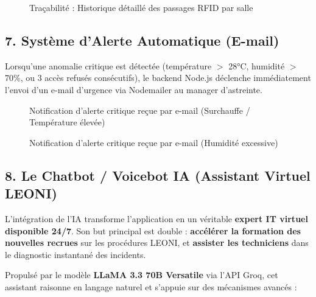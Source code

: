 \documentclass[12pt,a4paper]{report}
\begin{document}
\begin{figure}[h]
    \centering
    \caption{Traçabilité : Historique détaillé des passages RFID par salle}
\end{figure}

\subsection{7. Système d'Alerte Automatique (E-mail)}
Lorsqu'une anomalie critique est détectée (température $>$ 28°C, humidité $>$ 70\%, ou 3 accès refusés consécutifs), le backend Node.js déclenche immédiatement l'envoi d'un e-mail d'urgence via Nodemailer au manager d'astreinte.

\begin{figure}[h]
    \centering
    \caption{Notification d'alerte critique reçue par e-mail (Surchauffe / Température élevée)}
\end{figure}

\begin{figure}[h]
    \centering
    \caption{Notification d'alerte critique reçue par e-mail (Humidité excessive)}
\end{figure}

\subsection{8. Le Chatbot / Voicebot IA (Assistant Virtuel LEONI)}
L'intégration de l'IA transforme l'application en un véritable \textbf{expert IT virtuel disponible 24/7}. Son but principal est double : \textbf{accélérer la formation des nouvelles recrues} sur les procédures LEONI, et \textbf{assister les techniciens} dans le diagnostic instantané des incidents. 

Propulsé par le modèle \textbf{LLaMA 3.3 70B Versatile} via l'API Groq, cet assistant raisonne en langage naturel et s'appuie sur des mécanismes avancés :
\end{document}
